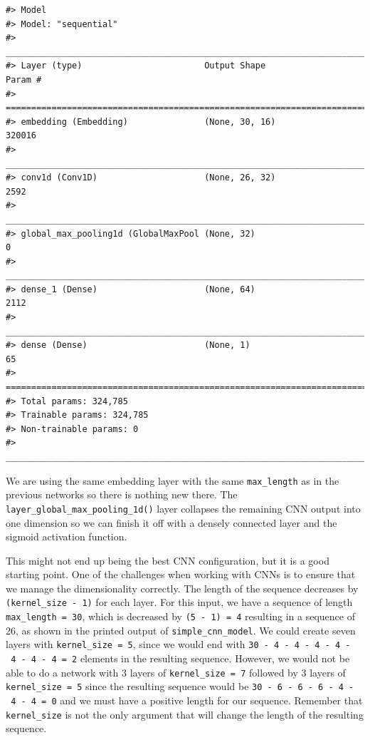 \documentclass[
]{krantz}
\begin{document}
\begin{verbatim}
#> Model
#> Model: "sequential"
#> ________________________________________________________________________________
#> Layer (type)                        Output Shape                    Param #     
#> ================================================================================
#> embedding (Embedding)               (None, 30, 16)                  320016      
#> ________________________________________________________________________________
#> conv1d (Conv1D)                     (None, 26, 32)                  2592        
#> ________________________________________________________________________________
#> global_max_pooling1d (GlobalMaxPool (None, 32)                      0           
#> ________________________________________________________________________________
#> dense_1 (Dense)                     (None, 64)                      2112        
#> ________________________________________________________________________________
#> dense (Dense)                       (None, 1)                       65          
#> ================================================================================
#> Total params: 324,785
#> Trainable params: 324,785
#> Non-trainable params: 0
#> ________________________________________________________________________________
\end{verbatim}

We are using the same embedding layer with the same \texttt{max\_length} as in the previous networks so there is nothing new there.
The \texttt{layer\_global\_max\_pooling\_1d()} layer collapses the remaining CNN output into one dimension so we can finish it off with a densely connected layer and the sigmoid activation function.

This might not end up being the best CNN configuration, but it is a good starting point.
One of the challenges when working with CNNs is to ensure that we manage the dimensionality correctly. The length of the sequence decreases by \texttt{(kernel\_size\ -\ 1)} for each layer. For this input, we have a sequence of length \texttt{max\_length\ =\ 30}, which is decreased by \texttt{(5\ -\ 1)\ =\ 4} resulting in a sequence of 26, as shown in the printed output of \texttt{simple\_cnn\_model}. We could create seven layers with \texttt{kernel\_size\ =\ 5}, since we would end with \texttt{30\ -\ 4\ -\ 4\ -\ 4\ -\ 4\ -\ 4\ -\ 4\ -\ 4\ =\ 2} elements in the resulting sequence. However, we would not be able to do a network with 3 layers of
\texttt{kernel\_size\ =\ 7} followed by 3 layers of \texttt{kernel\_size\ =\ 5} since the resulting sequence would be \texttt{30\ -\ 6\ -\ 6\ -\ 6\ -\ 4\ -\ 4\ -\ 4\ =\ 0} and we must have a positive length for our sequence.
Remember that \texttt{kernel\_size} is not the only argument that will change the length of the resulting sequence. 
\end{document}
